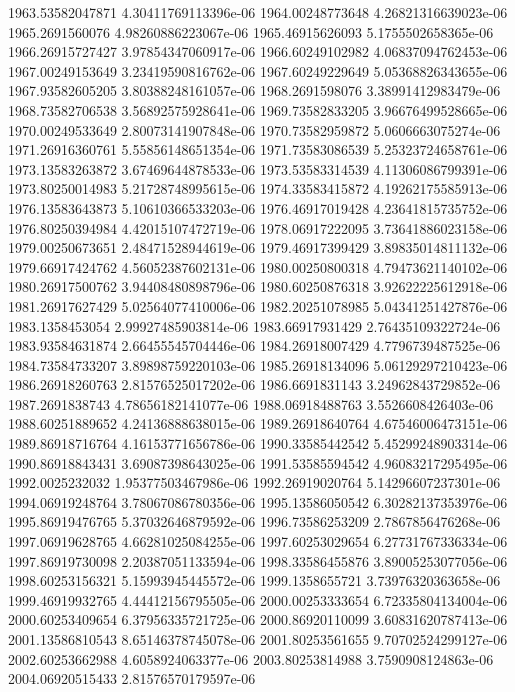 {1963.53582047871 4.30411769113396e-06
1964.00248773648 4.26821316639023e-06
1965.2691560076 4.98260886223067e-06
1965.46915626093 5.1755502658365e-06
1966.26915727427 3.97854347060917e-06
1966.60249102982 4.06837094762453e-06
1967.00249153649 3.23419590816762e-06
1967.60249229649 5.05368826343655e-06
1967.93582605205 3.80388248161057e-06
1968.2691598076 3.38991412983479e-06
1968.73582706538 3.56892575928641e-06
1969.73582833205 3.96676499528665e-06
1970.00249533649 2.80073141907848e-06
1970.73582959872 5.0606663075274e-06
1971.26916360761 5.55856148651354e-06
1971.73583086539 5.25323724658761e-06
1973.13583263872 3.67469644878533e-06
1973.53583314539 4.11306086799391e-06
1973.80250014983 5.21728748995615e-06
1974.33583415872 4.19262175585913e-06
1976.13583643873 5.10610366533203e-06
1976.46917019428 4.23641815735752e-06
1976.80250394984 4.42015107472719e-06
1978.06917222095 3.73641886023158e-06
1979.00250673651 2.48471528944619e-06
1979.46917399429 3.89835014811132e-06
1979.66917424762 4.56052387602131e-06
1980.00250800318 4.79473621140102e-06
1980.26917500762 3.94408480898796e-06
1980.60250876318 3.92622225612918e-06
1981.26917627429 5.02564077410006e-06
1982.20251078985 5.04341251427876e-06
1983.1358453054 2.99927485903814e-06
1983.66917931429 2.76435109322724e-06
1983.93584631874 2.66455545704446e-06
1984.26918007429 4.7796739487525e-06
1984.73584733207 3.89898759220103e-06
1985.26918134096 5.06129297210423e-06
1986.26918260763 2.81576525017202e-06
1986.6691831143 3.24962843729852e-06
1987.2691838743 4.78656182141077e-06
1988.06918488763 3.5526608426403e-06
1988.60251889652 4.24136888638015e-06
1989.26918640764 4.67546006473151e-06
1989.86918716764 4.16153771656786e-06
1990.33585442542 5.45299248903314e-06
1990.86918843431 3.69087398643025e-06
1991.53585594542 4.96083217295495e-06
1992.0025232032 1.95377503467986e-06
1992.26919020764 5.14296607237301e-06
1994.06919248764 3.78067086780356e-06
1995.13586050542 6.30282137353976e-06
1995.86919476765 5.37032646879592e-06
1996.73586253209 2.7867856476268e-06
1997.06919628765 4.66281025084255e-06
1997.60253029654 6.27731767336334e-06
1997.86919730098 2.20387051133594e-06
1998.33586455876 3.89005253077056e-06
1998.60253156321 5.15993945445572e-06
1999.1358655721 3.73976320363658e-06
1999.46919932765 4.44412156795505e-06
2000.00253333654 6.72335804134004e-06
2000.60253409654 6.37956335721725e-06
2000.86920110099 3.60831620787413e-06
2001.13586810543 8.65146378745078e-06
2001.80253561655 9.70702524299127e-06
2002.60253662988 4.6058924063377e-06
2003.80253814988 3.7590908124863e-06
2004.06920515433 2.81576570179597e-06
}
